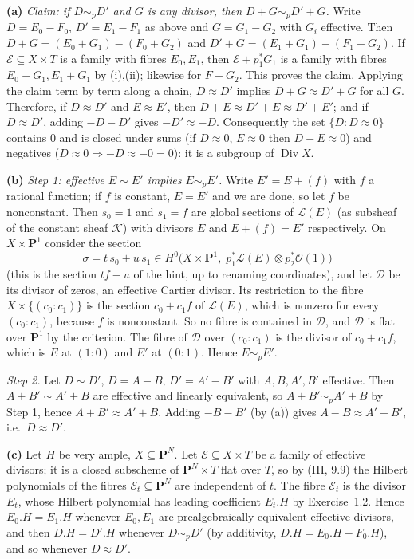 \documentclass[11pt]{article}
\begin{document}
\textbf{(a)} \emph{Claim: if $D\sim_pD'$ and $G$ is any divisor, then $D+G\sim_pD'+G$.} Write $D=E_0-F_0$, $D'=E_1-F_1$ as above and $G=G_1-G_2$ with $G_i$ effective. Then $D+G=(E_0+G_1)-(F_0+G_2)$ and $D'+G=(E_1+G_1)-(F_1+G_2)$. If $\mathcal E\subseteq X\times T$ is a family with fibres $E_0,E_1$, then $\mathcal E+p_1^*G_1$ is a family with fibres $E_0+G_1,E_1+G_1$ by (i),(ii); likewise for $F+G_2$. This proves the claim. Applying the claim term by term along a chain, $D\approx D'$ implies $D+G\approx D'+G$ for all $G$. Therefore, if $D\approx D'$ and $E\approx E'$, then $D+E\approx D'+E\approx D'+E'$; and if $D\approx D'$, adding $-D-D'$ gives $-D'\approx-D$. Consequently the set $\{D:D\approx0\}$ contains $0$ and is closed under sums (if $D\approx0$, $E\approx0$ then $D+E\approx0$) and negatives ($D\approx0\Rightarrow-D\approx-0=0$): it is a subgroup of $\operatorname{Div}X$.

\textbf{(b)} \emph{Step 1: effective $E\sim E'$ implies $E\sim_pE'$.} Write $E'=E+(f)$ with $f$ a rational function; if $f$ is constant, $E=E'$ and we are done, so let $f$ be nonconstant. Then $s_0=1$ and $s_1=f$ are global sections of $\mathcal L(E)$ (as subsheaf of the constant sheaf $\mathcal K$) with divisors $E$ and $E+(f)=E'$ respectively. On $X\times\mathbf P^1$ consider the section
\[ \sigma=t\,s_0+u\,s_1\in H^0\bigl(X\times\mathbf P^1,\;p_1^*\mathcal L(E)\otimes p_2^*\mathcal O(1)\bigr) \]
(this is the section $tf-u$ of the hint, up to renaming coordinates), and let $\mathcal D$ be its divisor of zeros, an effective Cartier divisor. Its restriction to the fibre $X\times\{(c_0:c_1)\}$ is the section $c_0+c_1f$ of $\mathcal L(E)$, which is nonzero for every $(c_0:c_1)$, because $f$ is nonconstant. So no fibre is contained in $\mathcal D$, and $\mathcal D$ is flat over $\mathbf P^1$ by the criterion. The fibre of $\mathcal D$ over $(c_0:c_1)$ is the divisor of $c_0+c_1f$, which is $E$ at $(1:0)$ and $E'$ at $(0:1)$. Hence $E\sim_pE'$.

\emph{Step 2.} Let $D\sim D'$, $D=A-B$, $D'=A'-B'$ with $A,B,A',B'$ effective. Then $A+B'\sim A'+B$ are effective and linearly equivalent, so $A+B'\sim_pA'+B$ by Step 1, hence $A+B'\approx A'+B$. Adding $-B-B'$ (by (a)) gives $A-B\approx A'-B'$, i.e.\ $D\approx D'$.

\textbf{(c)} Let $H$ be very ample, $X\subseteq\mathbf P^N$. Let $\mathcal E\subseteq X\times T$ be a family of effective divisors; it is a closed subscheme of $\mathbf P^N\times T$ flat over $T$, so by (III, 9.9) the Hilbert polynomials of the fibres $\mathcal E_t\subseteq\mathbf P^N$ are independent of $t$. The fibre $\mathcal E_t$ is the divisor $E_t$, whose Hilbert polynomial has leading coefficient $E_t.H$ by Exercise~1.2. Hence $E_0.H=E_1.H$ whenever $E_0,E_1$ are prealgebraically equivalent effective divisors, and then $D.H=D'.H$ whenever $D\sim_pD'$ (by additivity, $D.H=E_0.H-F_0.H$), and so whenever $D\approx D'$.
\end{document}
